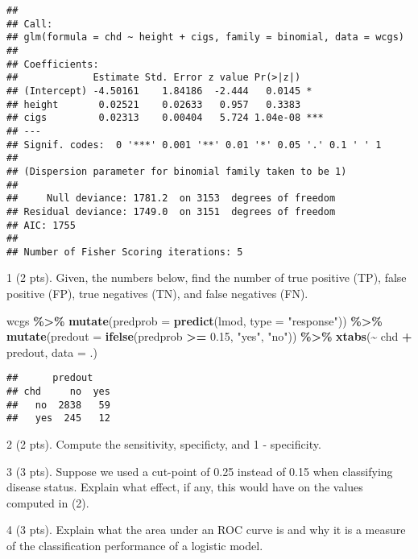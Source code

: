 \documentclass[
]{article}
\newenvironment{Shaded}{\begin{snugshade}}{\end{snugshade}}
\newcommand{\AttributeTok}[1]{\textcolor[rgb]{0.13,0.29,0.53}{#1}}
\newcommand{\FloatTok}[1]{\textcolor[rgb]{0.00,0.00,0.81}{#1}}
\newcommand{\FunctionTok}[1]{\textcolor[rgb]{0.13,0.29,0.53}{\textbf{#1}}}
\newcommand{\NormalTok}[1]{#1}
\newcommand{\SpecialCharTok}[1]{\textcolor[rgb]{0.81,0.36,0.00}{\textbf{#1}}}
\newcommand{\StringTok}[1]{\textcolor[rgb]{0.31,0.60,0.02}{#1}}
\begin{document}
\begin{verbatim}
## 
## Call:
## glm(formula = chd ~ height + cigs, family = binomial, data = wcgs)
## 
## Coefficients:
##             Estimate Std. Error z value Pr(>|z|)    
## (Intercept) -4.50161    1.84186  -2.444   0.0145 *  
## height       0.02521    0.02633   0.957   0.3383    
## cigs         0.02313    0.00404   5.724 1.04e-08 ***
## ---
## Signif. codes:  0 '***' 0.001 '**' 0.01 '*' 0.05 '.' 0.1 ' ' 1
## 
## (Dispersion parameter for binomial family taken to be 1)
## 
##     Null deviance: 1781.2  on 3153  degrees of freedom
## Residual deviance: 1749.0  on 3151  degrees of freedom
## AIC: 1755
## 
## Number of Fisher Scoring iterations: 5
\end{verbatim}

1 (2 pts). Given, the numbers below, find the number of true positive
(TP), false positive (FP), true negatives (TN), and false negatives
(FN).

\begin{Shaded}
\begin{Highlighting}[]
\NormalTok{wcgs }\SpecialCharTok{\%\textgreater{}\%}
  \FunctionTok{mutate}\NormalTok{(}\AttributeTok{predprob =} \FunctionTok{predict}\NormalTok{(lmod, }\AttributeTok{type =} \StringTok{"response"}\NormalTok{)) }\SpecialCharTok{\%\textgreater{}\%}
  \FunctionTok{mutate}\NormalTok{(}\AttributeTok{predout =} \FunctionTok{ifelse}\NormalTok{(predprob }\SpecialCharTok{\textgreater{}=} \FloatTok{0.15}\NormalTok{, }\StringTok{"yes"}\NormalTok{, }\StringTok{"no"}\NormalTok{)) }\SpecialCharTok{\%\textgreater{}\%}
  \FunctionTok{xtabs}\NormalTok{(}\SpecialCharTok{\textasciitilde{}}\NormalTok{ chd }\SpecialCharTok{+}\NormalTok{ predout, }\AttributeTok{data =}\NormalTok{ .)}
\end{Highlighting}
\end{Shaded}

\begin{verbatim}
##      predout
## chd     no  yes
##   no  2838   59
##   yes  245   12
\end{verbatim}

2 (2 pts). Compute the sensitivity, specificty, and 1 - specificity.

3 (3 pts). Suppose we used a cut-point of 0.25 instead of 0.15 when
classifying disease status. Explain what effect, if any, this would have
on the values computed in (2).

4 (3 pts). Explain what the area under an ROC curve is and why it is a
measure of the classification performance of a logistic model.
\end{document}
